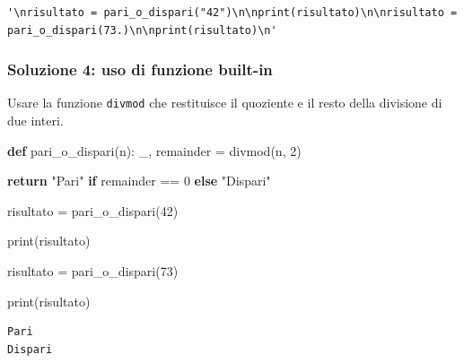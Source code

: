 \documentclass[
  letterpaper,
]{scrbook}
\newenvironment{Shaded}{\begin{snugshade}}{\end{snugshade}}
\newcommand{\BuiltInTok}[1]{\textcolor[rgb]{0.00,0.23,0.31}{#1}}
\newcommand{\ControlFlowTok}[1]{\textcolor[rgb]{0.00,0.23,0.31}{\textbf{#1}}}
\newcommand{\DecValTok}[1]{\textcolor[rgb]{0.68,0.00,0.00}{#1}}
\newcommand{\KeywordTok}[1]{\textcolor[rgb]{0.00,0.23,0.31}{\textbf{#1}}}
\newcommand{\NormalTok}[1]{\textcolor[rgb]{0.00,0.23,0.31}{#1}}
\newcommand{\OperatorTok}[1]{\textcolor[rgb]{0.37,0.37,0.37}{#1}}
\newcommand{\StringTok}[1]{\textcolor[rgb]{0.13,0.47,0.30}{#1}}
\begin{document}
\begin{verbatim}
'\nrisultato = pari_o_dispari("42")\n\nprint(risultato)\n\nrisultato = pari_o_dispari(73.)\n\nprint(risultato)\n'
\end{verbatim}

\subsubsection{Soluzione 4: uso di funzione
built-in}\label{soluzione-4-uso-di-funzione-built-in}

\begin{tcolorbox}[enhanced jigsaw, leftrule=.75mm, arc=.35mm, opacityback=0, rightrule=.15mm, titlerule=0mm, colbacktitle=quarto-callout-tip-color!10!white, colback=white, colframe=quarto-callout-tip-color-frame, bottomrule=.15mm, toprule=.15mm, bottomtitle=1mm, toptitle=1mm, title=\textcolor{quarto-callout-tip-color}{\faLightbulb}\hspace{0.5em}{Suggerimento}, breakable, coltitle=black, opacitybacktitle=0.6, left=2mm]

Usare la funzione \texttt{divmod} che restituisce il quoziente e il
resto della divisione di due interi.

\end{tcolorbox}

\begin{Shaded}
\begin{Highlighting}[]
\KeywordTok{def}\NormalTok{ pari\_o\_dispari(n):}
\NormalTok{  \_, remainder }\OperatorTok{=} \BuiltInTok{divmod}\NormalTok{(n, }\DecValTok{2}\NormalTok{)}

  \ControlFlowTok{return} \StringTok{"Pari"} \ControlFlowTok{if}\NormalTok{ remainder }\OperatorTok{==} \DecValTok{0} \ControlFlowTok{else} \StringTok{"Dispari"}

\NormalTok{risultato }\OperatorTok{=}\NormalTok{ pari\_o\_dispari(}\DecValTok{42}\NormalTok{)}

\BuiltInTok{print}\NormalTok{(risultato)}

\NormalTok{risultato }\OperatorTok{=}\NormalTok{ pari\_o\_dispari(}\DecValTok{73}\NormalTok{)}

\BuiltInTok{print}\NormalTok{(risultato)}
\end{Highlighting}
\end{Shaded}

\begin{verbatim}
Pari
Dispari
\end{verbatim}

\cleardoublepage
{}
{}
\appendix
\end{document}
